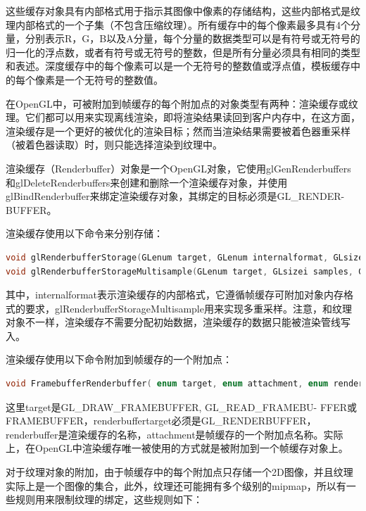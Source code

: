 这些缓存对象具有内部格式用于指示其图像中像素的存储结构，这些内部格式是纹理内部格式的一个子集（不包含压缩纹理）。所有缓存中的每个像素最多具有4个分量，分别表示R，G，B以及A分量，每个分量的数据类型可以是有符号或无符号的归一化的浮点数，或者有符号或无符号的整数，但是所有分量必须具有相同的类型和表述。深度缓存中的每个像素可以是一个无符号的整数值或浮点值，模板缓存中的每个像素是一个无符号的整数值。

在OpenGL中，可被附加到帧缓存的每个附加点的对象类型有两种：渲染缓存或纹理。它们都可以用来实现离线渲染，即将渲染结果读回到客户内存中，在这方面，渲染缓存是一个更好的被优化的渲染目标；然而当渲染结果需要被着色器重采样（被着色器读取）时，则只能选择渲染到纹理中。

渲染缓存（Renderbuffer）对象是一个OpenGL对象，它使用glGenRenderbuffers和glDeleteRenderbuffers​来创建和删除一个渲染缓存对象，并使用glBindRenderbuffer来绑定渲染缓存对象，其绑定的目标必须是GL\_RENDER- BUFFER。

渲染缓存使用以下命令来分别存储：

\begin{lstlisting}[language=C++]
void glRenderbufferStorage​(GLenum target​, GLenum internalformat​, GLsizei width​, GLsizei height​);
void glRenderbufferStorageMultisample​(GLenum target​, GLsizei samples​, GLenum internalformat​, GLsizei width​, GLsizei height​);
\end{lstlisting}

其中，internalformat表示渲染缓存的内部格式，它遵循帧缓存可附加对象内存格式的要求，glRenderbufferStorageMultisample用来实现多重采样。注意，和纹理对象不一样，渲染缓存不需要分配初始数据，渲染缓存的数据只能被渲染管线写入。

渲染缓存使用以下命令附加到帧缓存的一个附加点：

\begin{lstlisting}[language=C++]
void FramebufferRenderbuffer( enum target, enum attachment, enum renderbuffertarget, uint renderbuffer );
\end{lstlisting}

这里target是GL\_DRAW\_FRAMEBUFFER, GL\_READ\_FRAMEBU- FFER或FRAMEBUFFER，renderbuffertarget必须是GL\_RENDERBUFFER，renderbuffer是渲染缓存的名称，attachment是帧缓存的一个附加点名称。实际上，在OpenGL中渲染缓存唯一被使用的方式就是被附加到一个帧缓存对象上。

对于纹理对象的附加，由于帧缓存中的每个附加点只存储一个2D图像，并且纹理实际上是一个图像的集合，此外，纹理还可能拥有多个级别的mipmap，所以有一些规则用来限制纹理的绑定，这些规则如下：

